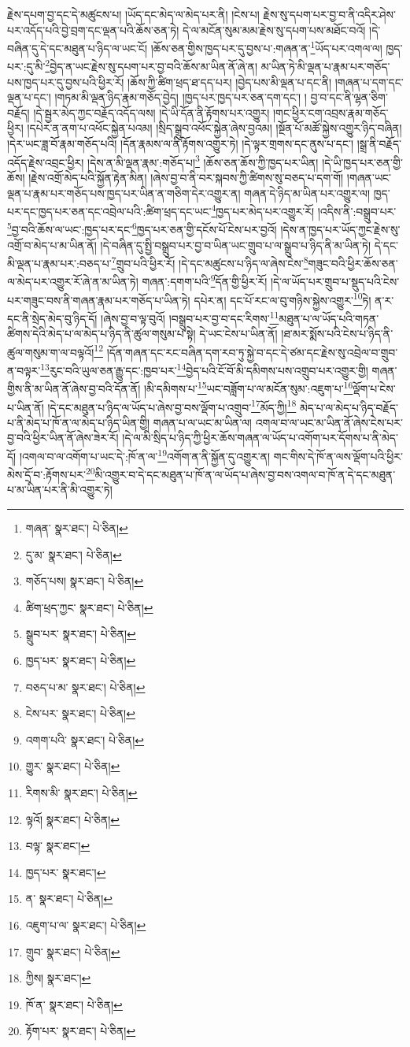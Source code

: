 རྗེས་དཔག་བྱ་དང་དེ་མཚུངས་པ། །ཡོད་དང་མེད་ལ་མེད་པར་ནི། །ངེས་པ། རྗེས་སུ་དཔག་པར་བྱ་བ་ནི་འདིར་ཤེས་པར་འདོད་པའི་བྱེ་བྲག་དང་ལྡན་པའི་ཆོས་ཅན་ཏེ། དེ་ལ་མངོན་སུམ་མམ་རྗེས་སུ་དཔག་པས་མཐོང་བའོ། །དེ་བཞིན་དུ་དེ་དང་མཐུན་པ་ཉིད་ལ་ཡང་ངོ། །ཆོས་ཅན་གྱིས་ཁྱད་པར་དུ་བྱས་པ་:གཞན་ན་\footnote{གཞན་  སྣར་ཐང་།  པེ་ཅིན། }ཡོད་པར་འགལ་ལ། ཁྱད་པར་:དུ་མི་\footnote{དུ་མ་  སྣར་ཐང་།  པེ་ཅིན། }བྱེད་ན་ཡང་རྗེས་སུ་དཔག་པར་བྱ་བའི་ཆོས་མ་ཡིན་ནོ་ཞེ་ན། མ་ཡིན་ཏེ་མི་ལྡན་པ་རྣམ་པར་གཅོད་པས་ཁྱད་པར་དུ་བྱས་པའི་ཕྱིར་རོ། །ཆོས་ཀྱི་ཚིག་ཕྲད་ཐ་དད་པར། །བྱེད་པས་མི་ལྡན་པ་དང་ནི། །གཞན་པ་དག་དང་ལྡན་པ་དང་། །གཏམ་མི་ལྡན་ཉིད་རྣམ་གཅོད་བྱེད། །ཁྱད་པར་ཁྱད་པར་ཅན་དག་དང་། །
བྱ་བ་དང་ནི་ལྷན་ཅིག་བརྗོད། །དེ་སྦྱར་མེད་ཀྱང་བརྗོད་འདོད་ལས། །དེ་ཡི་དོན་ནི་རྟོགས་པར་འགྱུར། །གང་ཕྱིར་ངག་འབྲས་རྣམ་གཅོད་ཕྱིར། །དཔེར་ན་ནག་པ་འཕོང་སྐྱེན་པའམ། །སྲིད་སྒྲུབ་འཕོང་སྐྱེན་ཞེས་བྱའམ། །སྔོན་པོ་མཚོ་སྐྱེས་འགྱུར་ཉིད་བཞིན། །དེར་ཡང་ཟླ་བོ་རྣམ་གཅོད་པའི། །དོན་རྣམས་ལ་ནི་རྟོགས་འགྱུར་ཏེ། །དེ་ལྟར་གྲགས་དང་ནུས་པ་དང་། །སྒྲ་ནི་བརྗོད་འདོད་རྗེས་འབྲང་ཕྱིར། །དེས་ན་མི་ལྡན་རྣམ་:གཅོད་པ།\footnote{གཅོད་པས།  སྣར་ཐང་།  པེ་ཅིན། } །ཆོས་ཅན་ཆོས་ཀྱི་ཁྱད་པར་ཡིན། །དེ་ཡི་ཁྱད་པར་ཅན་གྱི་ཆོས། །རྗེས་འགྲོ་མེད་པའི་སྐྱོན་རྟེན་མིན། །ཞེས་བྱ་བ་ནི་བར་སྐབས་ཀྱི་ཚིགས་སུ་བཅད་པ་དག་གོ། །གཞན་ཡང་ལྡན་པ་རྣམ་པར་གཅོད་པས་ཁྱད་པར་ཡིན་ན་གཅིག་དེར་འགྱུར་ན། གཞན་དེ་ཉིད་མ་ཡིན་པར་འགྱུར་ལ། ཁྱད་པར་དང་ཁྱད་པར་ཅན་དང་འབྲེལ་པའི་:ཚིག་ཕྲད་དང་ཡང་\footnote{ཚིག་ཕྲད་ཀྱང་  སྣར་ཐང་།  པེ་ཅིན། }ཁྱད་པར་མེད་པར་འགྱུར་རོ། །འདིས་ནི་:བསྒྲུབ་པར་\footnote{སྒྲུབ་པར་  སྣར་ཐང་།  པེ་ཅིན། }བྱ་བའི་ཆོས་ལ་ཡང་:ཁྱད་པར་དང་\footnote{ཁྱད་པར་  སྣར་ཐང་།  པེ་ཅིན། }ཁྱད་པར་ཅན་གྱི་དངོས་པོ་ངེས་པར་བྱའོ། །དེས་ན་ཁྱད་པར་ཡོད་ཀྱང་རྗེས་སུ་འགྲོ་བ་མེད་པ་མ་ཡིན་ནོ། །དེ་བཞིན་དུ་སྤྱི་བསྒྲུབ་པར་བྱ་བ་ཡིན་ཡང་གྲུབ་པ་ལ་སྒྲུབ་པ་ཉིད་ནི་མ་ཡིན་ཏེ། དེ་དང་མི་ལྡན་པ་རྣམ་པར་:བཅད་པ་\footnote{བཅད་པ་མ་  སྣར་ཐང་།  པེ་ཅིན། }གྲུབ་པའི་ཕྱིར་རོ། །དེ་དང་མཚུངས་པ་ཉིད་ལ་ཞེས་ངེས་\footnote{ངེས་པར་  སྣར་ཐང་།  པེ་ཅིན། }གཟུང་བའི་ཕྱིར་ཆོས་ཅན་ལ་མེད་པར་འགྱུར་རོ་ཞེ་ན་མ་ཡིན་ཏེ། གཞན་:དགག་པའི་\footnote{འགག་པའི་  སྣར་ཐང་།  པེ་ཅིན། }དོན་གྱི་ཕྱིར་རོ། །དེ་ལ་ཡོད་པར་གྲུབ་པ་སྡུད་པའི་ངེས་པར་གཟུང་བས་ནི་གཞན་རྣམ་པར་གཅོད་པ་ཡིན་ཏེ། དཔེར་ན། དང་པོ་རང་ལ་བུ་གཉིས་སྐྱེས་འགྱུར་\footnote{གྱུར་  སྣར་ཐང་།  པེ་ཅིན། }ཏེ། ན་ར་དང་ནི་སྲེད་མེད་བུ་ཉིད་དོ། །ཞེས་བྱ་བ་ལྟ་བུའོ། །བསྒྲུབ་པར་བྱ་བ་དང་རིགས་\footnote{རིགས་མི་  སྣར་ཐང་།  པེ་ཅིན། }མཐུན་པ་ལ་ཡོད་པའི་གཏན་ཚིགས་དེའི་མེད་པ་ལ་མེད་པ་ཉིད་ནི་ཚུལ་གསུམ་པ་སྟེ། དེ་ཡང་ངེས་པ་ཡིན་ནོ། །ཐ་མར་སྨོས་པའི་ངེས་པ་ཉིད་ནི་ཚུལ་གསུམ་ག་ལ་བལྟའོ།\footnote{ལྟའོ།  སྣར་ཐང་།  པེ་ཅིན། } །དོན་གཞན་དང་རང་བཞིན་དག་རབ་ཏུ་སྐྱེ་བ་དང་དེ་ཙམ་དང་རྗེས་སུ་འབྲེལ་བ་གྲུབ་ན་བལྟར་\footnote{བལྟ་  སྣར་ཐང་། }རུང་བའི་ཡུལ་ཅན་རྒྱུ་དང་:ཁྱབ་པར་\footnote{ཁྱད་པར་  སྣར་ཐང་། }བྱེད་པའི་ངོ་བོ་མི་དམིགས་པས་འགྲུབ་པར་འགྱུར་གྱི། གཞན་གྱིས་ནི་མ་ཡིན་ནོ་ཞེས་བྱ་བའི་དོན་ནོ། །མི་དམིགས་པ་\footnote{ན་  སྣར་ཐང་།  པེ་ཅིན། }ཡང་བཟློག་པ་ལ་མངོན་སུམ་:འཇུག་པ་\footnote{འཇུག་པ་ལ་  སྣར་ཐང་།  པེ་ཅིན། }ལྡོག་པ་ངེས་པ་ཡིན་ནོ། །དེ་དང་མཐུན་པ་ཉིད་ལ་ཡོད་པ་ཞེས་བྱ་བས་ལྡོག་པ་འགྲུབ་\footnote{གྲུབ་  སྣར་ཐང་།  པེ་ཅིན། }མོད་ཀྱི།\footnote{ཀྱིས།  སྣར་ཐང་། } མེད་པ་ལ་མེད་པ་ཉིད་བརྗོད་པ་ནི་མེད་པ་ཁོ་ན་ལ་མེད་པ་ཉིད་ཡིན་གྱི། གཞན་པ་ལ་ཡང་མ་ཡིན་ལ། འགལ་བ་ལ་ཡང་མ་ཡིན་ནོ་ཞེས་ངེས་པར་བྱ་བའི་ཕྱིར་ཡིན་ནོ་ཞེས་ཟེར་རོ། །དེ་ལ་མི་སྲིད་པ་ཉིད་ཀྱི་ཕྱིར་ཆོས་གཞན་ལ་ཡོད་པ་འགོག་པར་དོགས་པ་ནི་མེད་དོ། །འགལ་བ་ལ་འགོག་པ་ཡང་དེ་:ཁོ་ན་ལ་\footnote{ཁོ་ན་  སྣར་ཐང་།  པེ་ཅིན། }འགོག་ན་ནི་སྐྱོན་དུ་འགྱུར་ན། གང་གིས་དེ་ཁོ་ན་ལས་ལྡོག་པའི་ཕྱིར་མེས་དྲོ་བ་:རྟོགས་པར་\footnote{རྟོག་པར་  སྣར་ཐང་།  པེ་ཅིན། }མི་འགྱུར་བ་དེ་དང་མཐུན་པ་ཁོ་ན་ལ་ཡོད་པ་ཞེས་བྱ་བས་འགལ་བ་ཁོ་ན་དེ་དང་མཐུན་པ་མ་ཡིན་པར་ནི་མི་འགྱུར་ཏེ། 